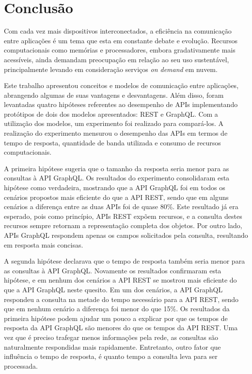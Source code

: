 \chapter{Conclusão}

Com cada vez mais dispositivos interconectados, a eficiência na comunicação entre aplicações é um tema que esta em constante debate e evolução. Recursos computacionais como memórias e processadores, embora gradativamente mais acessíveis, ainda demandam preocupação em relação ao seu uso sustentável, principalmente levando em consideração serviços \textit{on demand} em nuvem.

Este trabalho apresentou conceitos e modelos de comunicação entre aplicações, abrangendo algumas de suas vantagens e desvantagens. Além disso, foram levantadas quatro hipóteses referentes ao desempenho de APIs implementando protótipos de dois dos modelos apresentados: REST e GraphQL. Com a utilização dos modelos, um experimento foi realizado para compará-los. A realização do experimento mensurou o desempenho das APIs em termos de tempo de resposta, quantidade de banda utilizada e consumo de recursos computacionais.

A primeira hipótese sugeria que o tamanho da resposta seria menor para as consultas à API GraphQL. Os resultados do experimento consolidaram esta hipótese como verdadeira, mostrando que a API GraphQL foi em todos os cenários propostos mais eficiente do que a API REST, sendo que em alguns cenários a diferença entre as duas APIs foi de quase 80\%. Este resultado já era esperado, pois como princípio, APIs REST expõem recursos, e a consulta destes recursos sempre retornam a representação completa dos objetos. Por outro lado, APIs GraphQL respondem apenas os campos solicitados pela consulta, resultando em resposta mais concisas.

A segunda hipótese declarava que o tempo de resposta também seria menor para as consultas à API GraphQL. Novamente os resultados confirmaram esta hipótese, e em nenhum dos cenários a API REST se mostrou mais eficiente do que a API GraphQL neste quesito. Em um dos cenários, a API GraphQL respondeu a consulta na metade do tempo necessário para a API REST, sendo que em nenhum cenário a diferença foi menor do que 15\%. Os resultados da primeira hipótese podem ajudar um pouco a explicar por que os tempos de resposta da API GraphQL são menores do que os tempos da API REST. Uma vez que é preciso trafegar menos informações pela rede, as consultas são naturalmente respondidas mais rapidamente. Entretanto, outro fator que influência o tempo de resposta, é quanto tempo a consulta leva para ser processada.

